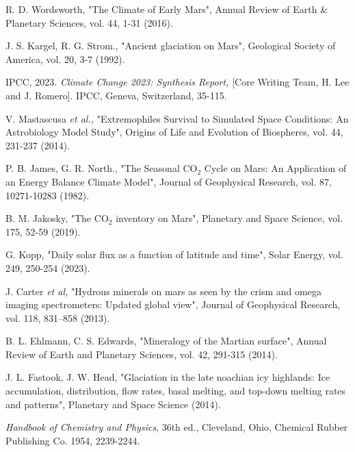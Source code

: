\documentclass[12pt,onecolumn]{revtex4-2}    %
\begin{document}
\begin{thebibliography}{}
 R. D. Wordsworth, "The Climate of Early Mars", Annual Review of Earth \& Planetary Sciences, vol. 44, 1-31 (2016).

 J. S. Kargel, R. G. Strom., "Ancient glaciation on Mars", Geological Society of America, vol. 20, 3-7 (1992).

 IPCC, 2023. \textit{Climate Change 2023: Synthesis Report,} [Core Writing Team, H. Lee and J. Romero]. IPCC, Geneva, Switzerland, 35-115.

 V. Mastascusa \textit{et al.,} "Extremophiles Survival to Simulated Space Conditions: An Astrobiology Model Study", Origins of Life and Evolution of Biospheres, vol. 44, 231-237 (2014).

 P. B. James, G. R. North., "The Seasonal $\mathrm{CO_2}$ Cycle on Mars: An Application of an Energy Balance Climate Model", Journal of Geophysical Research, vol. 87, 10271-10283 (1982).

 B. M. Jakosky, "The $\mathrm{CO_2}$ inventory on Mars", Planetary and Space Science, vol. 175, 52-59 (2019).

 G. Kopp, "Daily solar flux as a function of latitude and time", Solar Energy, vol. 249, 250-254 (2023).

 J. Carter \textit{et al,} "Hydrous minerals on mars as seen
by the crism and omega imaging spectrometers: Updated global view", Journal of Geophysical
Research, vol. 118, 831–858 (2013).

B. L. Ehlmann, C. S. Edwards, "Mineralogy of the Martian surface", Annual Review of Earth and Planetary Sciences, vol. 42, 291-315 (2014).

 J. L. Fastook, J. W. Head, "Glaciation in the late noachian icy highlands: Ice accumulation,
distribution, flow rates, basal melting, and top-down melting rates and patterns", Planetary and
Space Science (2014).

 \textit{Handbook of Chemistry and Physics}, 36th ed., Cleveland, Ohio, Chemical Rubber Publishing Co. 1954, 2239-2244.

\end{thebibliography} 

\newpage
 
\clearpage
\end{document}
